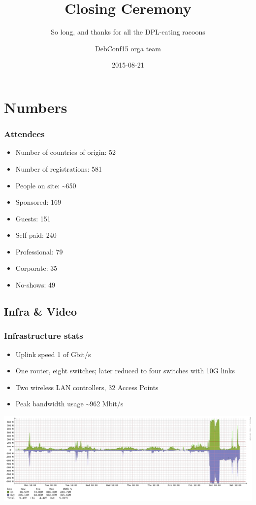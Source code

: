 \documentclass[t]{beamer}
\title{Closing Ceremony}
\subtitle{So long, and thanks for all the DPL-eating racoons}
\author{DebConf15 orga team}
\date{2015-08-21}
\begin{document}
\setcounter{tocdepth}{1}

\begin{frame}
	\titlepage
\end{frame}

\section{Numbers}


\begin{frame}
	\frametitle{Attendees}
	\begin{itemize}
		\item Number of countries of origin: 52
		\item Number of registrations: 581
		\item People on site: \~{}650
		\item Sponsored: 169
		\item Guests: 151
		\item Self-paid: 240
		\item Professional: 79
		\item Corporate: 35
		\item No-shows: 49
	\end{itemize}
\end{frame}


\subsection{Infra \& Video}

\begin{frame}
	\frametitle{Infrastructure stats}
	\begin{itemize}
		\item Uplink speed 1 of Gbit/s
		\item One router, eight switches; later reduced to four switches with 10G links
		\item Two wireless LAN controllers, 32 Access Points
		\item Peak bandwidth usage \~{}962 Mbit/s
	\end{itemize}
	\begin{center}
	\includegraphics[scale=0.2]{weekly2.pdf}
	\end{center}
\end{frame}
\end{document}
